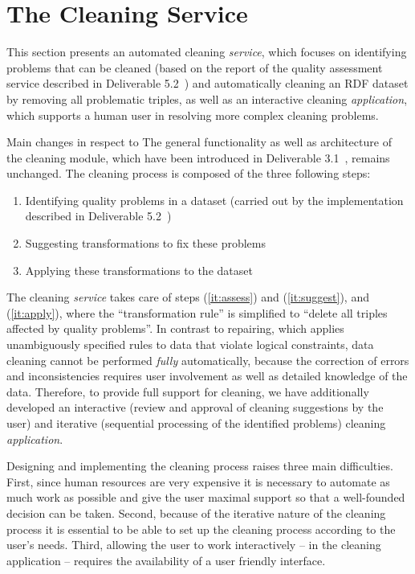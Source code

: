\section{The Cleaning Service}
\label{sec:cleaning}



This section presents an automated cleaning \emph{service}, which focuses on identifying problems that can be cleaned (based on the report of the quality assessment service described in Deliverable 5.2~\cite{diachron-d5.2}) and automatically cleaning an RDF dataset by removing all problematic triples, as well as an interactive cleaning \emph{application}, which supports a human user in resolving more complex cleaning problems.


Main changes in respect to 
The general functionality as well as architecture of the cleaning module, which have been introduced in Deliverable 3.1~\cite{d3.1}, remains unchanged.
The cleaning process is composed of the three following steps:
\begin{enumerate}
	\item\label{it:assess} Identifying quality problems in a dataset (carried out by the implementation described in Deliverable 5.2~\cite{diachron-d5.2})
	\item\label{it:suggest} Suggesting transformations to fix these problems
	\item\label{it:apply} Applying these transformations to the dataset
\end{enumerate}

The cleaning \emph{service} takes care of steps (\ref{it:assess}) and (\ref{it:suggest}), and (\ref{it:apply}), where the ``transformation rule'' is simplified to ``delete all triples affected by quality problems''.
In contrast to repairing, which applies unambiguously specified rules to data that violate logical constraints, data cleaning cannot be performed \emph{fully} automatically, because the correction of errors and inconsistencies requires user involvement as well as detailed knowledge of the data. 
Therefore, to provide full support for cleaning, we have additionally developed an interactive (review and approval of cleaning suggestions by the user) and iterative (sequential processing of the identified problems) cleaning \emph{application}.

Designing and implementing the cleaning process raises three main difficulties.
First, since human resources are very expensive it is necessary to automate as much work as possible and give the user maximal support so that a well-founded decision can be taken. 
Second, because of the iterative nature of the cleaning process it is essential to be able to set up the cleaning process according to the user's needs. 
Third, allowing the user to work interactively – in the cleaning application – requires the availability of a user friendly interface.

